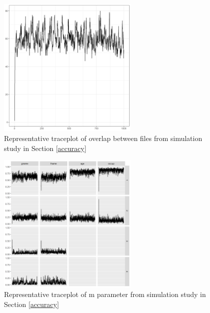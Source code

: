 \documentclass[ba]{imsart}
\begin{document}
\begin{figure}[!h]
	\begin{center}
		\includegraphics[width=0.6\textwidth]{../notes/figures/sim_overlap_trace} 
		\caption{Representative traceplot of overlap between files from simulation study in Section \ref{accuracy}}\label{fig:sim_overlap_trace}
	\end{center}
\end{figure}



\begin{figure}[!h]
	\begin{center}
		\includegraphics[width=0.6\textwidth]{../notes/figures/sim_m_trace} 
		\caption{Representative traceplot of m parameter from simulation study in Section \ref{accuracy}}\label{fig:sim_m_trace}
	\end{center}
\end{figure}
\end{document}
